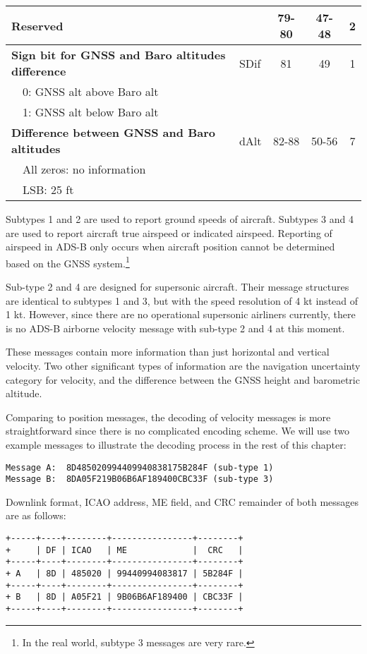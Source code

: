 \begin{table}[ht]
\begin{tabular}{|l|l|c|c|c|}
\textbf{Reserved} &  & 79-80 & 47-48 & 2 \\ \hline
\textbf{Sign bit for GNSS and Baro altitudes difference} & SDif & 81 & 49 & 1\\
~~0: GNSS alt above Baro alt &&&& \\
~~1: GNSS alt below Baro alt &&&& \\ \hline
\textbf{Difference between GNSS and Baro altitudes} & dAlt & 82-88 & 50-56 & 7\\
~~All zeros: no information &&&&\\
~~LSB: 25 ft &&&& \\ \hline
\end{tabular}
\end{table}

Subtypes 1 and 2 are used to report ground speeds of aircraft. Subtypes 3 and 4 are used to report aircraft true airspeed or indicated airspeed. Reporting of airspeed in ADS-B only occurs when aircraft position cannot be determined based on the GNSS system.\footnote{In the real world, subtype 3 messages are very rare.} 

Sub-type 2 and 4 are designed for supersonic aircraft. Their message structures are identical to subtypes 1 and 3, but with the speed resolution of 4 kt instead of 1 kt. However, since there are no operational supersonic airliners currently, there is no ADS-B airborne velocity message with sub-type 2 and 4 at this moment.

These messages contain more information than just horizontal and vertical velocity. Two other significant types of information are the navigation uncertainty category for velocity, and the difference between the GNSS height and barometric altitude. 

Comparing to position messages, the decoding of velocity messages is more straightforward since there is no complicated encoding scheme. We will use two example messages to illustrate the decoding process in the rest of this chapter:

\begin{verbatim}
Message A:  8D485020994409940838175B284F (sub-type 1)
Message B:  8DA05F219B06B6AF189400CBC33F (sub-type 3)
\end{verbatim}

Downlink format, ICAO address, ME field, and CRC remainder of both messages are as follows:

\begin{verbatim}
+-----+----+--------+----------------+--------+
+     | DF | ICAO   | ME             |  CRC   |
+-----+----+--------+----------------+--------+
+ A   | 8D | 485020 | 99440994083817 | 5B284F |
+-----+----+--------+----------------+--------+
+ B   | 8D | A05F21 | 9B06B6AF189400 | CBC33F |
+-----+----+--------+----------------+--------+
\end{verbatim}


